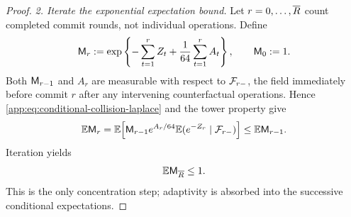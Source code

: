 \begin{proof}
\emph{2. Iterate the exponential expectation bound.}
Let \(r=0,\ldots,\overline R{}\) count completed commit rounds, not
individual operations.  Define
\begin{equation}
 \mathsf M_{r}:=
 \exp\left\{
   -\sum_{t=1}^{r}Z_{t}
   +\frac1{64}\sum_{t=1}^{r}A_t
 \right\},
 \qquad \mathsf M_{0}:=1.
 \label{app:eq:collision-supermartingale}
\end{equation}
Both \(\mathsf M_{r-1}\) and \(A_r\) are measurable with respect
to \(\mathcal F_{r-}\), the field immediately before commit \(r\)
after any intervening counterfactual operations. Hence
\eqref{app:eq:conditional-collision-laplace} and the tower property give
\[
 \mathbb E \mathsf M_{r}
 =
 \mathbb E\!\left[
   \mathsf M_{r-1}e^{A_r/64}
   \mathbb E(e^{-Z_{r}}\mid\mathcal F_{r-})
 \right]
 \le \mathbb E \mathsf M_{r-1}.
\]
Iteration yields
\begin{equation}
 \mathbb E \mathsf M_{\overline R}\le1.
 \label{app:eq:terminal-collision-supermartingale}
\end{equation}
This is the only concentration step; adaptivity is absorbed into the
successive conditional expectations.



\end{proof}
